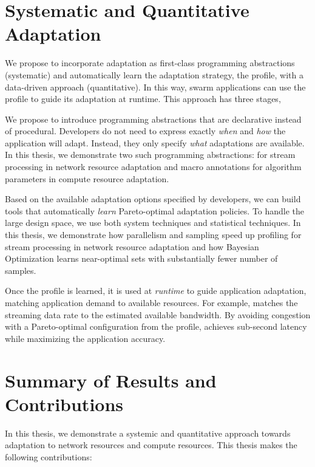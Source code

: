 \documentclass[thesis.tex]{subfiles}
\begin{document}
\section{Systematic and Quantitative Adaptation}
\label{sec:adaptation}

We propose to incorporate adaptation as first-class programming abstractions
(systematic) and automatically learn the adaptation strategy, the profile, with
a data-driven approach (quantitative). In this way, swarm applications can use
the profile to guide its adaptation at runtime. This approach has three stages,

 We propose to introduce programming
abstractions that are declarative instead of procedural. Developers do not need
to express exactly \emph{when} and \emph{how} the application will
adapt. Instead, they only specify \emph{what} adaptations are available. In this
thesis, we demonstrate two such programming abstractions: \maybe{} for stream
processing in network resource adaptation and macro annotations for algorithm
parameters in compute resource adaptation.

 Based on the available adaptation
options specified by developers, we can build tools that automatically
\emph{learn} Pareto-optimal adaptation policies. To handle the large design
space, we use both system techniques and statistical techniques. In this thesis,
we demonstrate how parallelism and sampling speed up profiling for stream
processing in network resource adaptation and how Bayesian Optimization learns
near-optimal sets with substantially fewer number of samples.

 Once the profile is learned, it is used at
\emph{runtime} to guide application adaptation, matching application demand to
available resources. For example, \awstream{} matches the streaming data rate to
the estimated available bandwidth. By avoiding congestion with a Pareto-optimal
configuration from the profile, \awstream{} achieves sub-second latency while
maximizing the application accuracy.

\section{Summary of Results and Contributions}
\label{sec:contributions}

In this thesis, we demonstrate a systemic and quantitative approach towards
adaptation to network resources and compute resources. This thesis makes the
following contributions:
\end{document}
